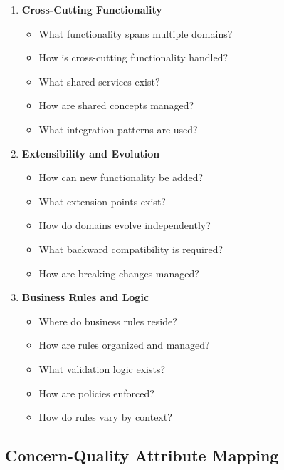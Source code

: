 \documentclass[11pt,letterpaper]{article}
\begin{document}
\begin{enumerate}[label=\textbf{C\arabic*:}, leftmargin=2.5em]
    \item \textbf{Cross-Cutting Functionality}
    \begin{itemize}[nosep]
        \item What functionality spans multiple domains?
        \item How is cross-cutting functionality handled?
        \item What shared services exist?
        \item How are shared concepts managed?
        \item What integration patterns are used?
    \end{itemize}
    
    \item \textbf{Extensibility and Evolution}
    \begin{itemize}[nosep]
        \item How can new functionality be added?
        \item What extension points exist?
        \item How do domains evolve independently?
        \item What backward compatibility is required?
        \item How are breaking changes managed?
    \end{itemize}
    
    \item \textbf{Business Rules and Logic}
    \begin{itemize}[nosep]
        \item Where do business rules reside?
        \item How are rules organized and managed?
        \item What validation logic exists?
        \item How are policies enforced?
        \item How do rules vary by context?
    \end{itemize}
\end{enumerate}

\subsection{Concern-Quality Attribute Mapping}
\end{document}
